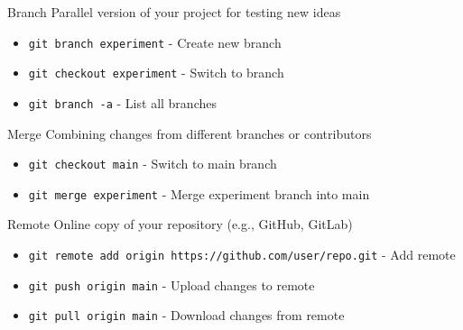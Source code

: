 \documentclass[aspectratio=1609]{beamer}
\begin{document}
\begin{frame}[fragile]{}
    \footnotesize
    \begin{tblock}{Branch}
        Parallel version of your project for testing new ideas
        \begin{itemize}
            \item \verb|git branch experiment| - Create new branch
            \item \verb|git checkout experiment| - Switch to branch
            \item \verb|git branch -a| - List all branches
        \end{itemize}
        \end{tblock}
\begin{tblock}{Merge}
    Combining changes from different branches or contributors
    \begin{itemize}
        \item \verb|git checkout main| - Switch to main branch
        \item \verb|git merge experiment| - Merge experiment branch into main
    \end{itemize}
    \end{tblock}
    \begin{tblock}{Remote}
        Online copy of your repository (e.g., GitHub, GitLab)
        \begin{itemize}
            \item \verb|git remote add origin https://github.com/user/repo.git| - Add remote
            \item \verb|git push origin main| - Upload changes to remote
            \item \verb|git pull origin main| - Download changes from remote
        \end{itemize}
        \end{tblock}
\end{frame}
\end{document}
